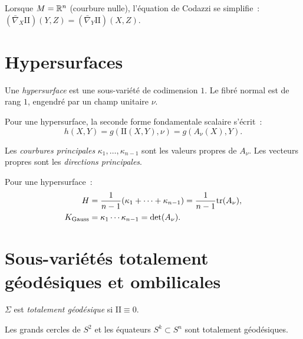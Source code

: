 \begin{remarque}
Lorsque $M = \mathbb{R}^n$ (courbure nulle), l'\'equation de Codazzi se simplifie~:
$(\bar{\nabla}_X \mathrm{I\!I})(Y,Z) = (\bar{\nabla}_Y \mathrm{I\!I})(X,Z)$.
\end{remarque}

\section{Hypersurfaces}

\begin{definition}[Hypersurface]
Une \emph{hypersurface} est une sous-vari\'et\'e de codimension $1$. Le fibr\'e normal
est de rang $1$, engendr\'e par un champ unitaire $\nu$.
\end{definition}

Pour une hypersurface, la seconde forme fondamentale scalaire s'\'ecrit~:
\[
    h(X, Y) = g(\mathrm{I\!I}(X, Y), \nu) = g(A_\nu(X), Y).
\]

\begin{definition}
Les \emph{courbures principales} $\kappa_1, \ldots, \kappa_{n-1}$ sont les valeurs
propres de $A_\nu$. Les vecteurs propres sont les \emph{directions principales}.
\end{definition}

\begin{proposition}
Pour une hypersurface~:
\begin{align*}
    H &= \frac{1}{n-1}(\kappa_1 + \cdots + \kappa_{n-1})
       = \frac{1}{n-1} \mathrm{tr}(A_\nu), \\
    K_{\text{Gauss}} &= \kappa_1 \cdots \kappa_{n-1} = \det(A_\nu).
\end{align*}
\end{proposition}

\section{Sous-vari\'et\'es totalement g\'eod\'esiques et ombilicales}

\begin{definition}
$\Sigma$ est \emph{totalement g\'eod\'esique} si $\mathrm{I\!I} \equiv 0$.
\end{definition}

\begin{exemple}
Les grands cercles de $S^2$ et les \'equateurs $S^{k} \subset S^n$ sont totalement
g\'eod\'esiques.
\end{exemple}

